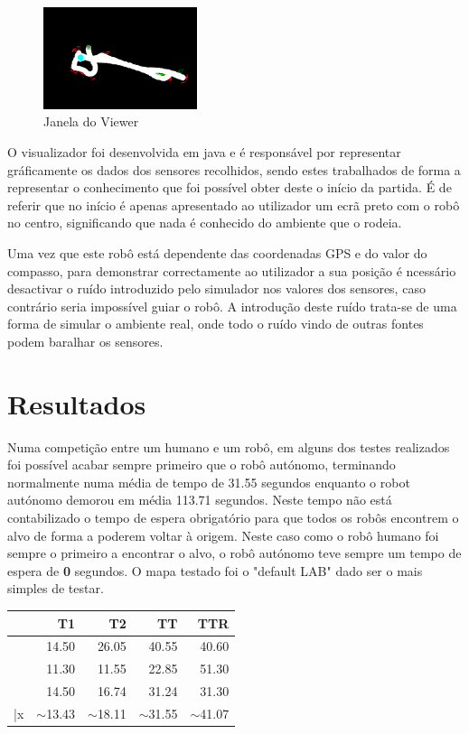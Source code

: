 \documentclass[conference]{IEEEtran}
\begin{document}
\begin{figure}
\centering
 \includegraphics[width=0.4\textwidth]{image/untitled2.png}
\caption{Janela do Viewer}
\label{fig:screen}
\end{figure}

O visualizador foi desenvolvida em java e é responsável por representar gráficamente os dados dos sensores recolhidos, sendo estes trabalhados de forma a representar o conhecimento que foi possível obter deste o início da partida. É de referir que no início é apenas apresentado ao utilizador um ecrã preto com o robô no centro, significando que nada é conhecido do ambiente que o rodeia.

Uma vez que este robô está dependente das coordenadas GPS e do valor do compasso, para demonstrar correctamente ao utilizador a sua posição é ncessário desactivar o ruído introduzido pelo simulador nos valores dos sensores, caso contrário seria impossível guiar o robô. A introdução deste ruído trata-se de uma forma de simular o ambiente real, onde todo o ruído vindo de outras fontes podem baralhar os sensores.


\section{Resultados}

Numa competição entre um humano e um robô, em alguns dos testes realizados foi possível acabar sempre primeiro que o robô autónomo, terminando normalmente numa média de tempo de 31.55 segundos enquanto o robot autónomo demorou em média 113.71 segundos. Neste tempo não está contabilizado o tempo de espera obrigatório para que todos os robôs encontrem o alvo de forma a poderem voltar à origem. Neste caso como o robô humano foi sempre o primeiro a encontrar o alvo, o robô autónomo teve sempre um tempo de espera de \textbf{0} segundos.
O mapa testado foi o "default LAB" dado ser o mais simples de testar.



\begin{center}

    \begin{tabular}{ crrrr }
      \hline
      & T1 & T2 & TT & TTR \\
      \hline
      & 14.50 & 26.05 & 40.55 & 40.60 \\
      & 11.30 & 11.55 & 22.85 & 51.30 \\
      & 14.50 & 16.74 & 31.24 & 31.30 \\
      \hline
      \bar{x} & $\mathtt{\sim}$13.43 & $\mathtt{\sim}$18.11 & $\mathtt{\sim}$31.55 & $\mathtt{\sim}$41.07 \\
      \hline
    \end{tabular}
\end{center}
\end{document}
